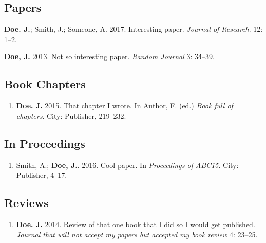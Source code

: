 \documentclass{article}
\begin{document}
\subsection{Papers}

\begin{enumerate}[label={[\arabic*]}]

\item \textbf{Doe. J.}; Smith, J.; Someone, A. 2017. Interesting paper. \textit{Journal of Research}. 12: 1--2. 

\item \textbf{Doe, J.} 2013. Not so interesting paper. \textit{Random Journal} 3: 34--39. 

\end{enumerate}

\subsection{Book Chapters}

\begin{enumerate}[resume*] %

\item \textbf{Doe. J.} 2015. That chapter I wrote. In Author, F. (ed.) \emph{Book full of chapters}. City: Publisher, 219--232. 

\end{enumerate}

\subsection{In Proceedings}

\begin{enumerate}[resume*] 

\item Smith, A.; \textbf{Doe, J.}. 2016. Cool paper. In \emph{Proceedings of ABC15}. City: Publisher, 4--17.

\end{enumerate}

\subsection{Reviews}

\begin{enumerate}[resume*]

\item \textbf{Doe. J.} 2014. Review of that one book that I did so I would get published.
\emph{Journal that will not accept my papers but accepted my book review} 4: 23--25.
\end{enumerate}
\end{document}
